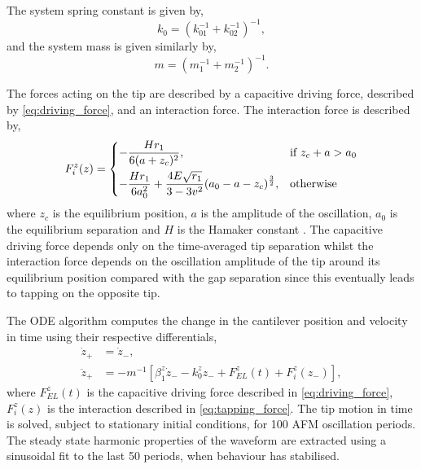 \documentclass{article}
\begin{document}
The system spring constant is given by,
\begin{equation}
	k_0 = \left( k_{01}^{-1} + k_{02}^{-1} \right)^{-1},
\end{equation}
and the system mass is given similarly by,
\begin{equation}
	m = \left( m_1^{-1} + m_2^{-1} \right)^{-1}.
\end{equation}

The forces acting on the tip are described by a capacitive driving force, described by \eqref{eq:driving_force}, and an interaction force. The interaction force is described by,
\begin{equation}
	F_i^z(z) =
	\begin{dcases}
	-\frac{H r_1}{6(a+z_c)^2}, & \text{if } z_c + a > a_0 \\
	-\frac{H r_1}{6a_0^2} + \frac{4E\sqrt{r_1}}{3 - 3v^2} (a_0-a-z_c)^{\frac{3}{2}}, & \text{otherwise}
	\end{dcases}
	\label{eq:tapping_force}
\end{equation}
where $z_c$ is the equilibrium position, $a$ is the amplitude of the oscillation, $a_0$ is the equilibrium separation and $H$ is the Hamaker constant \cite{tamayo1996deformation, garcia1999attractive, san2002unifying, lee2002nonlinear}. The capacitive driving force depends only on the time-averaged tip separation whilst the interaction force depends on the oscillation amplitude of the tip around its equilibrium position compared with the gap separation since this eventually leads to tapping on the opposite tip.

The ODE algorithm computes the change in the cantilever position and velocity in time using their respective differentials,
\begin{align}
	\dot{z}_+ &= \dot{z}_-, \\
	\ddot{z}_+ &= -m^{-1}\left[\beta_1^z\dot{z}_- - k_0^zz_- + F_{EL}^z(t) + F_i^z(z_-)\right],
\end{align}
where $F_{EL}^z(t)$ is the capacitive driving force described in \eqref{eq:driving_force}, $F_i^z(z)$ is the interaction described in \eqref{eq:tapping_force}. The tip motion in time is solved, subject to stationary initial conditions, for 100 AFM oscillation periods. The steady state harmonic properties of the waveform are extracted using a sinusoidal fit to the last 50 periods, when behaviour has stabilised.
\end{document}
